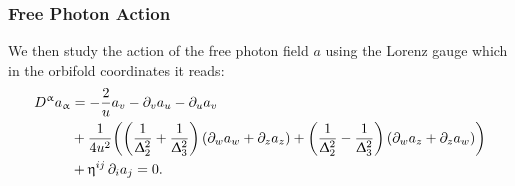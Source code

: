 \subsubsection{Free Photon Action}

We then study the action of the free photon field $a$ using the Lorenz gauge which in the orbifold coordinates it reads:
\begin{equation}
  \begin{split}
    D^{\alpha} a_{\alpha}
    &
    =
    - \frac{2}{u} a_{v}
    - \ipd{v} a_u
    - \ipd{u} a_v
    \\
    &
    + \frac{1}{4 u^2}
    \qty(%
      \qty( \frac{1}{\Delta_2^2} + \frac{1}{\Delta_3^2} )\,
      \qty( \ipd{w} a_w + \ipd{z} a_z )
      +
      \qty( \frac{1}{\Delta_2^2} - \frac{1}{\Delta_3^2} )\,
      \qty( \ipd{w} a_z + \ipd{z} a_w )
    )
    \\
    &
    + \eta^{ij}\, \ipd{i} a_j
    =
    0.
  \end{split}
\end{equation}

